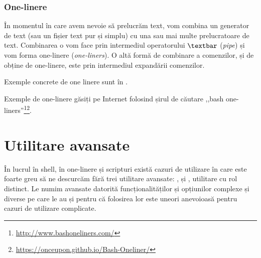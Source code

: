 \subsubsection{One-linere}
\label{sec:cli:basic-proc:proc:one-liners}

În momentul în care avem nevoie să prelucrăm text, vom combina un generator de text (sau un fișier text pur și simplu) cu una sau mai multe prelucratoare de text.
Combinarea o vom face prin intermediul operatorului \texttt{$\textbar$} (\textit{pipe}) și vom forma one-linere (\textit{one-liners}).
O altă formă de combinare a comenzilor, și de obține de one-linere, este prin intermediul expandării comenzilor.

Exemple concrete de one linere sunt în .


Exemple de one-linere găsiți pe Internet folosind șirul de căutare ,,bash one-liners''\footnote{\url{http://www.bashoneliners.com/}}\footnote{\url{https://onceupon.github.io/Bash-Oneliner/}}.

\section{Utilitare avansate}
\label{sec:cli:advanced}

În lucrul în shell, în one-linere și scripturi există cazuri de utilizare în care este foarte greu să ne descurcăm fără trei utilitare avansate: ,  și , utilitare cu rol distinct.
Le numim avansate datorită funcționalităților și opțiunilor complexe și diverse pe care le au și pentru că folosirea lor este uneori anevoioasă pentru cazuri de utilizare complicate.

